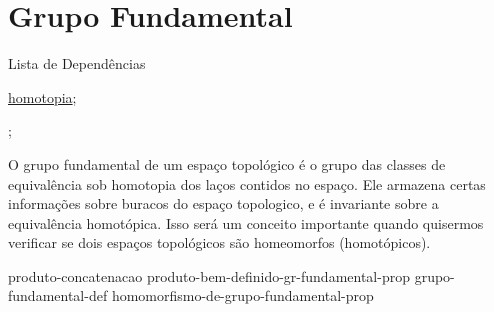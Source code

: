 \section{Grupo Fundamental}
\label{grupo-fundamental}

\begin{titlemize}{Lista de Dependências}
	\item \hyperref[Homotopia]{homotopia};\\ %
	\item \hyperref[]{};
\end{titlemize}

O grupo fundamental de um espaço topológico é o grupo das classes de equivalência sob homotopia dos laços contidos no espaço. Ele armazena certas informações sobre buracos do espaço topologico, e é invariante sobre a equivalência homotópica. Isso será um conceito importante quando quisermos verificar se dois espaços topológicos são homeomorfos (homotópicos).

{produto-concatenacao}%
{produto-bem-definido-gr-fundamental-prop}
{grupo-fundamental-def}
{homomorfismo-de-grupo-fundamental-prop}
